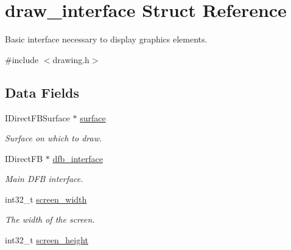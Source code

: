 \hypertarget{structdraw__interface}{}\section{draw\+\_\+interface Struct Reference}
\label{structdraw__interface}


Basic interface necessary to display graphics elements.  




{\ttfamily \#include $<$drawing.\+h$>$}

\subsection*{Data Fields}
\begin{DoxyCompactItemize}
\item 
I\+Direct\+F\+B\+Surface $\ast$ \hyperlink{structdraw__interface_abb892b86ae82069cd63a4d0f1c91bd30}{surface}\hypertarget{structdraw__interface_abb892b86ae82069cd63a4d0f1c91bd30}{}\label{structdraw__interface_abb892b86ae82069cd63a4d0f1c91bd30}

\begin{DoxyCompactList}\small\item\em Surface on which to draw. \end{DoxyCompactList}\item 
I\+Direct\+FB $\ast$ \hyperlink{structdraw__interface_a8eaf314b98d7198fdf4a46f114f87170}{dfb\+\_\+interface}\hypertarget{structdraw__interface_a8eaf314b98d7198fdf4a46f114f87170}{}\label{structdraw__interface_a8eaf314b98d7198fdf4a46f114f87170}

\begin{DoxyCompactList}\small\item\em Main D\+FB interface. \end{DoxyCompactList}\item 
int32\+\_\+t \hyperlink{structdraw__interface_add5c8a4ff9831a2e377de7402fb98aa8}{screen\+\_\+width}\hypertarget{structdraw__interface_add5c8a4ff9831a2e377de7402fb98aa8}{}\label{structdraw__interface_add5c8a4ff9831a2e377de7402fb98aa8}

\begin{DoxyCompactList}\small\item\em The width of the screen. \end{DoxyCompactList}\item 
int32\+\_\+t \hyperlink{structdraw__interface_a32efc671a65774a3b6f767546e3c3824}{screen\+\_\+height}\hypertarget{structdraw__interface_a32efc671a65774a3b6f767546e3c3824}{}\label{structdraw__interface_a32efc671a65774a3b6f767546e3c3824}


\end{DoxyCompactItemize}
